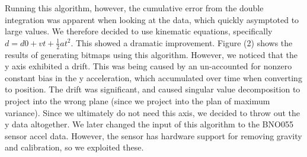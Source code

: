 \documentclass{sig-alternate-05-2015}
\begin{document}
Running this algorithm, however, the cumulative error from the double integration was apparent when looking at the data, which quickly asymptoted to large values. We therefore decided to use kinematic equations, specifically $d = d0 + vt + \frac{1}{2}at^2$. This showed a dramatic improvement. Figure (2) shows the results of generating bitmaps using this algorithm. However, we noticed that the y axis exhibited a drift. This was being caused by an un-accounted for nonzero constant bias in the y acceleration, which accumulated over time when converting to position. The drift was significant, and caused singular value decomposition to project into the wrong plane (since we project into the plan of maximum variance). Since we ultimately do not need this axis, we decided to throw out the y data altogether. We later changed the input of this algorithm to the BNO055 sensor accel data. However, the sensor has hardware support for removing gravity and calibration, so we exploited these.
\end{document}

